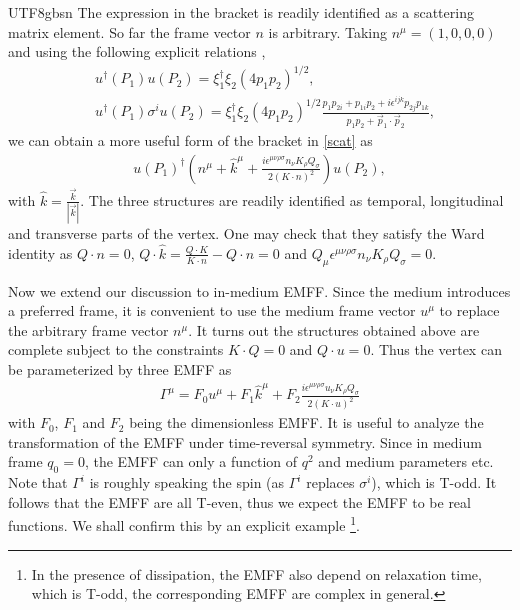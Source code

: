 \documentclass[11pt]{article}\def\baselinestretch{1.4}
\def\e{{\epsilon}}
\def\G{{\Gamma}}
\def\m{{\mu}}
\def\n{{\nu}}
\def\r{{\rho}}
\def\s{{\sigma}}
\def\x{{\xi}}
\def\({\left(}
\def\){\right)}
\newcommand{\dg}{\dagger}
\begin{document}
\begin{CJK}{UTF8}{gbsn}
The expression in the bracket is readily identified as a scattering matrix element. So far the frame vector $n$ is arbitrary. Taking $n^\m=(1,0,0,0)$ and using the following explicit relations \cite{Dong:2021fxn},
\begin{align}\label{spinor_products}
&u^\dg(P_1)u(P_2) = \x_1^\dg\x_2(4p_1p_2)^{1/2},\nonumber\\
&u^\dg(P_1)\s^i u(P_2) = \x_1^\dg\x_2(4p_1p_2)^{1/2}\frac{p_1p_{2i}+p_{1i}p_2+i\e^{ijk}p_{2j}p_{1k}}{p_1p_2+\vec{p}_1\cdot\vec{p}_2},
\end{align}
we can obtain a more useful form of the bracket in \eqref{scat} as
\begin{align}
u(P_1)^\dg \(n^\m+\hat{k}^\m+\frac{i\e^{\m\n\r\s} n_\n K_\r Q_\s}{2(K\cdot n)^2}\) u(P_2),
\end{align}
with $\hat{k}=\frac{\vec{k}}{|\vec{k}|}$. The three structures are readily identified as temporal, longitudinal and transverse parts of the vertex. One may check that they satisfy the Ward identity as $Q\cdot n=0$, $Q\cdot\hat{k}=\frac{Q\cdot K}{K\cdot n}-Q\cdot n=0$ and $Q_\m \e^{\m\n\r\s} n_\n K_\r Q_\s=0$.

Now we extend our discussion to in-medium EMFF. Since the medium introduces a preferred frame, it is convenient to use the medium frame vector $u^\m$ to replace the arbitrary frame vector $n^\m$. It turns out the structures obtained above are complete subject to the constraints $K\cdot Q=0$ and $Q\cdot u=0$. Thus the vertex can be parameterized by three EMFF as
\begin{align}%
\G^\m=F_0u^\m+F_1\hat{k}^\m+F_2\frac{i\e^{\m\n\r\s}u_\n K_\r Q_\s}{2(K\cdot u)^2} \label{parameterization}
\end{align}
with $F_0$, $F_1$ and $F_2$ being the dimensionless EMFF. It is useful to analyze the transformation of the EMFF under time-reversal symmetry. Since in medium frame $q_0=0$, the EMFF can only a function of $q^2$ and medium parameters etc. Note that $\G^i$ is roughly speaking the spin (as $\G^i$ replaces $\s^i$), which is T-odd. It follows that the EMFF are all T-even, thus we expect the EMFF to be real functions. We shall confirm this by an explicit example \footnote{In the presence of dissipation, the EMFF also depend on relaxation time, which is T-odd, the corresponding EMFF are complex in general.}.


\end{CJK}
\end{document}
